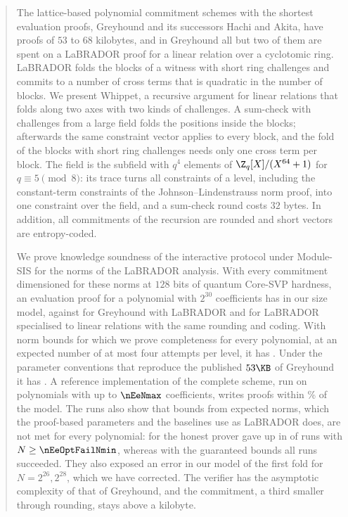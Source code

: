 \begin{abstract}
The lattice-based polynomial commitment schemes with the shortest evaluation proofs, Greyhound and its successors Hachi and Akita, have proofs of $53$ to $68$ kilobytes, and in Greyhound all but two of them are spent on a LaBRADOR proof for a linear relation over a cyclotomic ring. LaBRADOR folds the blocks of a witness with short ring challenges and commits to a number of cross terms that is quadratic in the number of blocks. We present Whippet, a recursive argument for linear relations that folds along two axes with two kinds of challenges. A sum-check with challenges from a large field folds the positions inside the blocks; afterwards the same constraint vector applies to every block, and the fold of the blocks with short ring challenges needs only one cross term per block. The field is the subfield with $q^4$ elements of $\Z_q[X]/(X^{64}+1)$ for $q\equiv5\pmod8$: its trace turns all constraints of a level, including the constant-term constraints of the Johnson--Lindenstrauss norm proof, into one constraint over the field, and a sum-check round costs $32$ bytes. In addition, all commitments of the recursion are rounded and short vectors are entropy-coded.

We prove knowledge soundness of the interactive protocol under Module-SIS for the norms of the LaBRADOR analysis. With every commitment dimensioned for these norms at $128$ bits of quantum Core-SVP hardness, an evaluation proof for a polynomial with $2^{30}$ coefficients has \nWQc\KB{} in our size model, against \nBQc\KB{} for Greyhound with LaBRADOR and \nSQc\KB{} for LaBRADOR specialised to linear relations with the same rounding and coding. With norm bounds for which we prove completeness for every polynomial, at an expected number of at most four attempts per level, it has \nGQc\KB. Under the parameter conventions that reproduce the published $53\KB$ of Greyhound it has \nWCc\KB. A reference implementation of the complete scheme, run on polynomials with up to $\nEeNmax$ coefficients, writes proofs within \nEeDevAbs\% of the model. The runs also show that bounds from expected norms, which the proof-based parameters and the baselines use as LaBRADOR does, are not met for every polynomial: for \nEeOptFailKindText{} the honest prover gave up in \nEeOptFails{} of \nEeOptFailKindRuns{} runs with $N\ge\nEeOptFailNmin$, whereas with the guaranteed bounds all \nEeGcRuns{} runs succeeded. They also exposed an error in our model of the first fold for $N=2^{26},2^{28}$, which we have corrected. The verifier has the asymptotic complexity of that of Greyhound, and the commitment, a third smaller through rounding, stays above a kilobyte.
\end{abstract}

